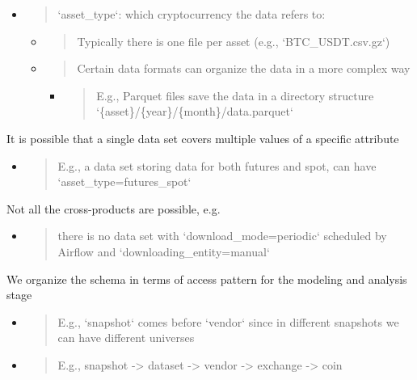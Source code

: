 \documentclass[11pt, reqno]{amsart}
\begin{document}
\begin{itemize}
\item
  \begin{quote}
  `asset\_type`: which cryptocurrency the data refers to:
  \end{quote}

  \begin{itemize}
  \item
    \begin{quote}
    Typically there is one file per asset (e.g., `BTC\_USDT.csv.gz`)
    \end{quote}
  \item
    \begin{quote}
    Certain data formats can organize the data in a more complex way
    \end{quote}

    \begin{itemize}
    \item
      \begin{quote}
      E.g., Parquet files save the data in a directory structure
      `\{asset\}/\{year\}/\{month\}/data.parquet`
      \end{quote}
    \end{itemize}
  \end{itemize}
\end{itemize}

It is possible that a single data set covers multiple values of a
specific attribute

\begin{itemize}
\item
  \begin{quote}
  E.g., a data set storing data for both futures and spot, can have
  `asset\_type=futures\_spot`
  \end{quote}
\end{itemize}

Not all the cross-products are possible, e.g.

\begin{itemize}
\item
  \begin{quote}
  there is no data set with `download\_mode=periodic` scheduled by
  Airflow and `downloading\_entity=manual`
  \end{quote}
\end{itemize}

We organize the schema in terms of access pattern for the modeling and
analysis stage

\begin{itemize}
\item
  \begin{quote}
  E.g., `snapshot` comes before `vendor` since in different snapshots we
  can have different universes
  \end{quote}
\item
  \begin{quote}
  E.g., snapshot -\textgreater{} dataset -\textgreater{} vendor
  -\textgreater{} exchange -\textgreater{} coin
  \end{quote}
\end{itemize}
\end{document}
